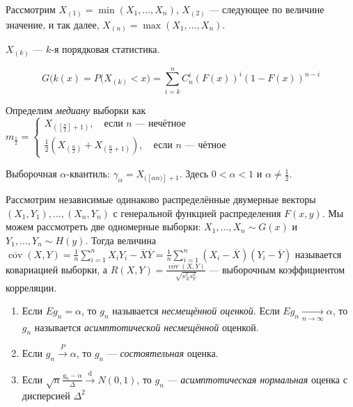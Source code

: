 \documentclass[11pt,openany,a4paper]{scrartcl}
\theoremstyle{plain}
\theoremstyle{definition}
\newcommand{\underto}[1]{\xrightarrow[#1]{}}
\newcommand{\overto}[1]{\xrightarrow{#1}}
\newcommand{\ol}{\overline}
\DeclareMathOperator{\cov}{cov}
\begin{document}
Рассмотрим $X_{(1)} = \min(X_1, \ldots, X_n)$, $X_{(2)}$ — следующее по величине значение,
и так далее, $X_{(n)} = \max(X_1, \ldots, X_n)$.

$X_{(k)}$ — $k$-я порядковая статистика.

$$
G(k(x) = P\big(X_{(k)} < x\big) = \sum\limits_{i=k}^nC_n^i(F(x))^i(1-F(x))^{n-i}
$$

Определим \emph{медиану} выборки как $m_{\frac{1}{2}} = \begin{cases}
    X_{([\frac{n}{2}] + 1)},\quad\text{если } n \text{ — нечётное} \\
    \frac{1}{2}(X_{(\frac{n}{2})} + X_{(\frac{n}{2} + 1)}),\quad
    \text{если } n \text{ — чётное}
\end{cases}$

Выборочная $\alpha$-квантиль: $\gamma_\alpha = X_{([\alpha n)] + 1}$. Здесь $0 < \alpha < 1$ 
и $\alpha \neq \frac{1}{2}$.

Рассмотрим независимые одинаково распределённые двумерные векторы
$(X_1, Y_1), \ldots, (X_n, Y_n)$ с генеральной функцией распределения $F(x, y)$.
Мы можем рассмотреть две одномерные выборки: $X_1, \ldots, X_n \sim G(x)$ и
$Y_1, \ldots, Y_n \sim H(y)$.
Тогда величина $\ol{\cov}(X, Y) = \frac{1}{n} \sum\limits_{i=1}^n X_iY_i - \ol X \ol Y =
\frac{1}{n}\sum\limits_{i=1}^n(X_i - \ol X)(Y_i - \ol Y)$ называется ковариацией выборки,
а $R(X, Y) = \frac{\ol{\cov}(X, Y)}{\sqrt{s_X^2s_Y^2}}$ — выборочным коэффициентом 
корреляции.

\begin{enumerate}
    \item Если $Eg_n = \alpha$, то $g_n$ называется
    \emph{несмещённой оценкой}. Если $Eg_n \underto{n \to \infty} \alpha$, то $g_n$ 
    называется \emph{асимптотической несмещённой} оценкой.
    \item Если $g_n \overto{P} \alpha$, то $g_n$ — \emph{состоятельная} 
    оценка.
    \item Если
    $\sqrt n \frac{g_n - \alpha}{\Delta} \overto{\mathrm d} N(0, 1)$, то $g_n$ — 
    \emph{асимптотическая нормальная} оценка с дисперсией $\Delta^2$
\end{enumerate}
\end{document}
